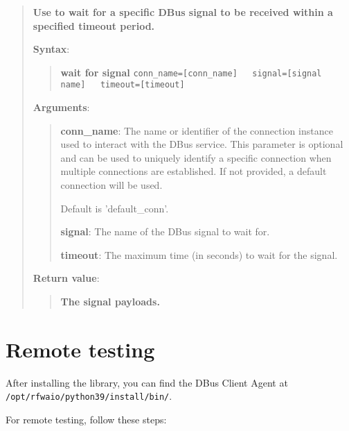 \begin{quote}
\textbf{Use to wait for a specific DBus signal to be received within a specified timeout period.}

\textbf{Syntax}:
\begin{quote}
\textbf{wait for signal}
\texttt{conn\_name={[}conn\_name{]}\ \ \ signal={[}signal name{]}\ \ \ timeout={[}timeout{]}}
\end{quote}

\textbf{Arguments}:

\begin{quote}
\textbf{conn\_name}: The name or identifier of the connection instance used to interact with the DBus service.
  This parameter is optional and can be used to uniquely identify a specific connection
  when multiple connections are established. If not provided, a default connection will be used.

  Default is 'default\_conn'.

\vspace{\baselineskip}

\textbf{signal}: The name of the DBus signal to wait for.

\vspace{\baselineskip}

\textbf{timeout}: The maximum time (in seconds) to wait for the signal.
\end{quote}

\textbf{Return value}:

\begin{quote}
\textbf{The signal payloads.}
\end{quote}
\end{quote}

\hypertarget{remote-testing}{%
\section{Remote testing}\label{remote-testing}}

After installing the library, you can find the DBus Client Agent at \texttt{/opt/rfwaio/python39/install/bin/}.

For remote testing, follow these steps:

